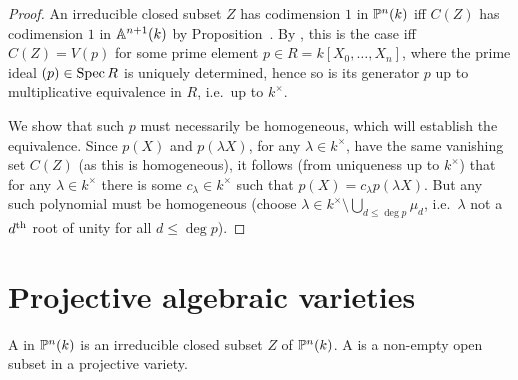 \documentclass[a4paper,parskip=half,numbers=enddot, DIV=12]{scrreprt}
\begin{document}
\begin{proof}
An irreducible closed subset $Z$ has codimension $1$ in $\mathbb{P}^n(k)$ iff $C(Z)$ has codimension $1$ in $\mathbb{A}^{n+1}(k)$ by Proposition~. By \cite[Proposition~2.1.3]{alg1}, this is the case iff $C(Z) = V(p)$ for some prime element
$p\in R = k[X_0,\ldots,X_n]$, where the prime ideal $(p)\in \operatorname{Spec} R$ is uniquely determined, hence so is its generator $p$ up to multiplicative equivalence in $R$, i.e.\ up to $k^\times$.

We show that such $p$ must necessarily be homogeneous, which will establish the equivalence. Since $p(X)$ and $p(\lambda X)$, for any $\lambda\in k^\times$, have the same vanishing set $C(Z)$ (as this is homogeneous), it follows (from uniqueness up to $k^\times$) that for any $\lambda\in k^\times$ there is some $c_\lambda\in k^\times$ such that $p(X) = c_\lambda p(\lambda X)$. But any such polynomial must be homogeneous (choose $\lambda\in k^\times \setminus\bigcup_{d\leq\deg p} \mu_d$,
i.e.\ $\lambda$ not a $d^{\text{th}}$ root of unity for all $d\leq\deg p$).
\end{proof}

\section{Projective algebraic varieties}

\begin{defi}
    A  in $\mathbb{P}^n(k)$ is an irreducible closed subset $Z$ of $\mathbb{P}^n(k)$. A  is a non-empty open subset in a projective variety.
\end{defi}
\end{document}
